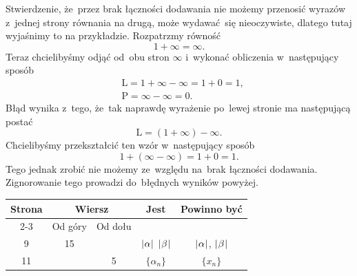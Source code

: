 \documentclass[a4paper,11pt]{article}
\numberwithin{equation}{section}
\begin{document}
\VerSpaceFour





\noindent
{} Stwierdzenie, że~przez brak łączności dodawania nie
możemy przenosić wyrazów z~jednej strony równania na drugą, może
wydawać~się nieoczywiste, dlatego tutaj wyjaśnimy to na przykładzie.
Rozpatrzmy równość
\begin{equation}
  \label{eq:LojasiewiczWDTFRz-06}
  1 + \infty = \infty.
\end{equation}
Teraz chcielibyśmy odjąć od~obu stron $\infty$ i~wykonać obliczenia
w~następujący sposób
\begin{equation}
  \label{eq:LojasiewiczWDTFRz-07}
  \begin{split}
    &\textrm{L} = 1 + \infty - \infty = 1 + 0 = 1, \\
    &\textrm{P} = \infty - \infty = 0.
  \end{split}
\end{equation}
Błąd wynika z~tego, że~tak naprawdę wyrażenie po~lewej stronie ma
następującą postać
\begin{equation}
  \label{eq:LojasiewiczWDTFRz-08}
  \textrm{L} = ( 1 + \infty ) - \infty.
\end{equation}
Chcielibyśmy przekształcić ten wzór w~następujący sposób
\begin{equation}
  \label{eq:LojasiewiczWDTFRz-09}
  1 + ( \infty - \infty ) = 1 + 0 = 1.
\end{equation}
Tego jednak zrobić nie możemy ze~względu na~brak łączności dodawania.
Zignorowanie tego prowadzi do~błędnych wyników powyżej.

\VerSpaceFour





\newpage



\begin{center}

  \begin{tabular}{|c|c|c|c|c|}
    \hline
    Strona & \multicolumn{2}{c|}{Wiersz} & Jest
                              & Powinno być \\ \cline{2-3}
    & Od góry & Od dołu & & \\
    \hline
    \hphantom{0}9 & 15 & & $| \hspace{0.05em}  \alpha  \hspace{0.05em} |$ $| \hspace{0.05em}  \beta  \hspace{0.05em} |$
           & $| \hspace{0.05em}  \alpha  \hspace{0.05em} |$, $| \hspace{0.05em}  \beta  \hspace{0.05em} |$ \\
    11 & & \hphantom{0}5 & $\{ \alpha_{ n } \}$ & $\{ x_{ n } \}$ \\
    \hline
  \end{tabular}

\end{center}
\end{document}
